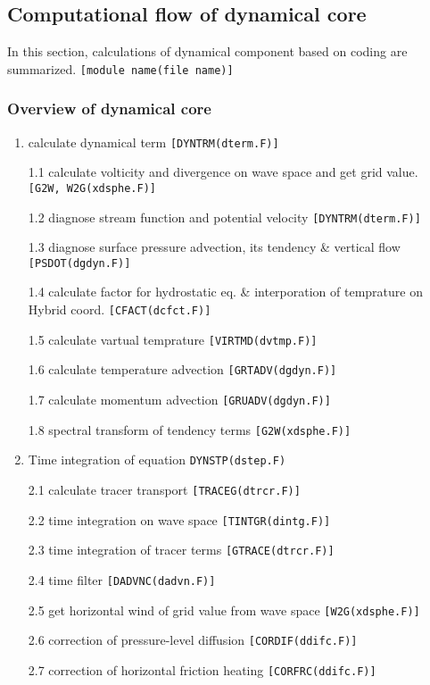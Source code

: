 \hypertarget{computational-flow-of-dynamical-core}{%
\subsection{Computational flow of dynamical
core}\label{computational-flow-of-dynamical-core}}

In this section, calculations of dynamical component based on coding are
summarized. \texttt{{[}module\ name(file\ name){]}}

\hypertarget{overview-of-dynamical-core}{%
\subsubsection{Overview of dynamical
core}\label{overview-of-dynamical-core}}

\begin{enumerate}
\def\labelenumi{\arabic{enumi}.}
\item
  calculate dynamical term \texttt{{[}DYNTRM(dterm.F){]}}

  1.1 calculate volticity and divergence on wave space and get grid
  value. \texttt{{[}G2W,\ W2G(xdsphe.F){]}}

  1.2 diagnose stream function and potential velocity
  \texttt{{[}DYNTRM(dterm.F){]}}

  1.3 diagnose surface pressure advection, its tendency \& vertical flow
  \texttt{{[}PSDOT(dgdyn.F){]}}

  1.4 calculate factor for hydrostatic eq. \& interporation of
  temprature on Hybrid coord. \texttt{{[}CFACT(dcfct.F){]}}

  1.5 calculate vartual temprature \texttt{{[}VIRTMD(dvtmp.F){]}}

  1.6 calculate temperature advection \texttt{{[}GRTADV(dgdyn.F){]}}

  1.7 calculate momentum advection \texttt{{[}GRUADV(dgdyn.F){]}}

  1.8 spectral transform of tendency terms \texttt{{[}G2W(xdsphe.F){]}}
\item
  Time integration of equation \texttt{DYNSTP(dstep.F)}

  2.1 calculate tracer transport \texttt{{[}TRACEG(dtrcr.F){]}}

  2.2 time integration on wave space \texttt{{[}TINTGR(dintg.F){]}}

  2.3 time integration of tracer terms \texttt{{[}GTRACE(dtrcr.F){]}}

  2.4 time filter \texttt{{[}DADVNC(dadvn.F){]}}

  2.5 get horizontal wind of grid value from wave space
  \texttt{{[}W2G(xdsphe.F){]}}

  2.6 correction of pressure-level diffusion
  \texttt{{[}CORDIF(ddifc.F){]}}

  2.7 correction of horizontal friction heating
  \texttt{{[}CORFRC(ddifc.F){]}}
\end{enumerate}
